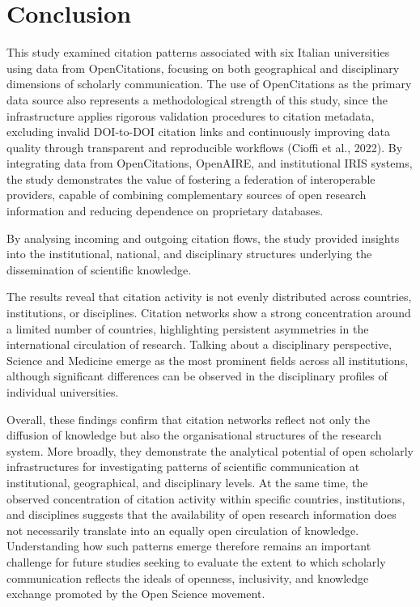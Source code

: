 \documentclass[year=2026]{cup-journal}
\begin{document}
\section{Conclusion}

This study examined citation patterns associated with six Italian universities using data from OpenCitations, focusing on both geographical and disciplinary dimensions of scholarly communication. The use of OpenCitations as the primary data source also represents a methodological strength of this study, since the infrastructure applies rigorous validation procedures to citation metadata, excluding invalid DOI-to-DOI citation links and continuously improving data quality through transparent and reproducible workflows (Cioffi et al., 2022). By integrating data from OpenCitations, OpenAIRE, and institutional IRIS systems, the study demonstrates the value of fostering a federation of interoperable providers, capable of combining complementary sources of open research information and reducing dependence on proprietary databases.

By analysing incoming and outgoing citation flows, the study provided insights into the institutional, national, and disciplinary structures underlying the dissemination of scientific knowledge. 

The results reveal that citation activity is not evenly distributed across countries, institutions, or disciplines. Citation networks show a strong concentration around a limited number of countries, highlighting persistent asymmetries in the international circulation of research. Talking about a disciplinary perspective, Science and Medicine emerge as the most prominent fields across all institutions, although significant differences can be observed in the disciplinary profiles of individual universities.

Overall, these findings confirm that citation networks reflect not only the diffusion of knowledge but also the organisational structures of the research system. More broadly, they demonstrate the analytical potential of open scholarly infrastructures for investigating patterns of scientific communication at institutional, geographical, and disciplinary levels. At the same time, the observed concentration of citation activity within specific countries, institutions, and disciplines suggests that the availability of open research information does not necessarily translate into an equally open circulation of knowledge. Understanding how such patterns emerge therefore remains an important challenge for future studies seeking to evaluate the extent to which scholarly communication reflects the ideals of openness, inclusivity, and knowledge exchange promoted by the Open Science movement.
\end{document}
